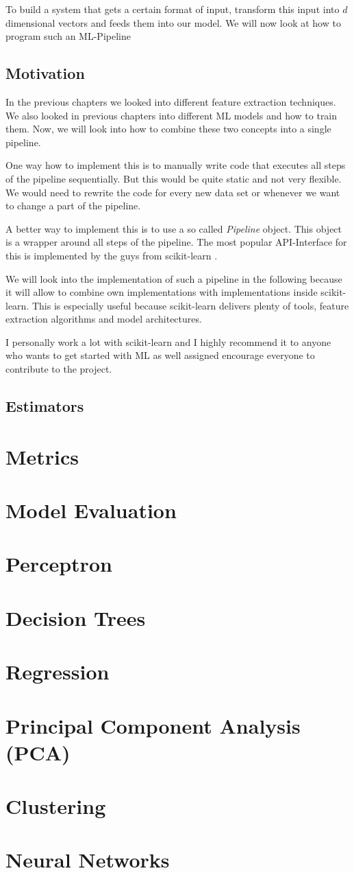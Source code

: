 \documentclass[a4paper]{article}
\begin{document}
To build a system that gets a certain format of input, transform this input into $d$ dimensional vectors and feeds them into our model.
We will now look at how to program such an ML-Pipeline
\subsection{Motivation}
In the previous chapters we looked into different feature extraction techniques.
We also looked in previous chapters into different ML models and how to train them.
Now, we will look into how to combine these two concepts into a single pipeline.

One way how to implement this is to manually write code that executes all steps of the pipeline sequentially.
But this would be quite static and not very flexible. We would need to rewrite the code for every new data set or whenever
we want to change a part of the pipeline.

A better way to implement this is to use a so called \textit{Pipeline} object. This object is a wrapper around all steps of the pipeline.
The most popular API-Interface for this is implemented by the guys from scikit-learn \cite{scikit-learn}.

We will look into the implementation of such a pipeline in the following because it will allow to combine
own implementations with implementations inside scikit-learn. This is especially useful because scikit-learn
delivers plenty of tools, feature extraction algorithms and model architectures.

I personally work a lot with scikit-learn and I highly recommend it to anyone who wants to get started with ML as well assigned
encourage everyone to contribute to the project.

\subsection{Estimators}


\section{Metrics}
\section{Model Evaluation}
\section{Perceptron}
\section{Decision Trees}
\section{Regression}
\section{Principal Component Analysis (PCA)}
\section{Clustering}
\section{Neural Networks}


\end{document}
